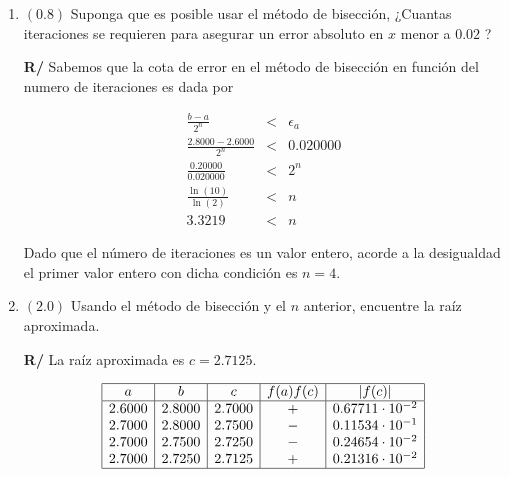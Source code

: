 \documentclass[12pt]{article}
\begin{document}
\begin{enumerate}[leftmargin=*,widest=9]
\begin{enumerate}[label=\alph*]
   \item \((0.8)\) Suponga que es posible usar el método de bisección, ¿Cuantas iteraciones se requieren para asegurar un error absoluto en \(x\) menor a \(0.02\) ?
   
   
\textbf{R/} Sabemos que la cota de error en el método de bisección en función del numero de iteraciones es dada por 
   
   \begin{eqnarray*}
   \frac{b - a}{2^n} &<& \epsilon_a \\
   \frac{2.8000 - 2.6000}{2^n} &<& 0.020000 \\
   \frac{0.20000}{0.020000} &<& 2^n \\
   \frac{\ln(10)}{\ln(2)} &<& n \\
   3.3219 &<& n
   \end{eqnarray*}
   
   Dado que el número de iteraciones es un valor entero, acorde a la desigualdad el primer valor entero con dicha condición es \(n=4\).

   \item \((2.0)\) Usando el método de bisección y el \(n\) anterior, encuentre la raíz aproximada.

\textbf{R/} La raíz aproximada es \(c = 2.7125 \).
 
\begin{equation*}
     \begin{array}{|c|c|c|c|c|}
   \hline
   a & b & c & f(a)f(c) & |f(c)| \\
   \hline
   2.6000 & 2.8000 & 2.7000 & + & 0.67711 \cdot 10^{-2} \\
   2.7000 & 2.8000 & 2.7500 & - & 0.11534 \cdot 10^{-1} \\
   2.7000 & 2.7500 & 2.7250 & - & 0.24654 \cdot 10^{-2} \\
   2.7000 & 2.7250 & 2.7125 & + & 0.21316 \cdot 10^{-2} \\
   \hline
   \end{array}
\end{equation*}   

    \end{enumerate}
    
  \end{enumerate}

\end{document}
